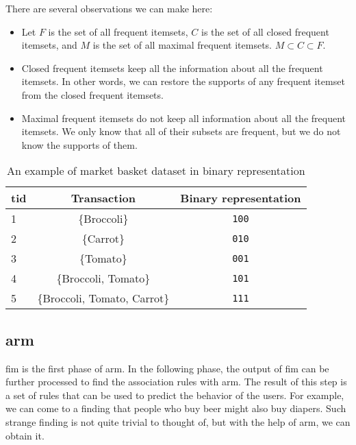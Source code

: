 There are several observations we can make here:
\begin{itemize}
    \item Let $F$ is the set of all frequent itemsets, $C$ is the set of all closed frequent itemsets, and $M$ is the set of all maximal frequent itemsets. $M \subset C \subset F$.
    \item Closed frequent itemsets keep all the information about all the frequent itemsets. In other words, we can restore the supports of any frequent itemset from the closed frequent itemsets.
    \item Maximal frequent itemsets do not keep all information about all the frequent itemsets. We only know that all of their subsets are frequent, but we do not know the supports of them.
\end{itemize}


\begin{table}[tb]
    \centering
    \begin{tabular}{|l|c|c|}
        \hline
        \textbf{\ac{tid}} & \textbf{Transaction}         & \textbf{Binary representation} \\ \hline
        1            & \{Broccoli\}                 & \texttt{100}                   \\ \hline
        2            & \{Carrot\}                   & \texttt{010}                   \\ \hline
        3            & \{Tomato\}                   & \texttt{001}                   \\ \hline
        4            & \{Broccoli, Tomato\}         & \texttt{101}                   \\ \hline
        5            & \{Broccoli, Tomato, Carrot\} & \texttt{111}                   \\ \hline
    \end{tabular}
    \caption{An example of market basket dataset in binary representation}
    \label{tab:market-basket-dataset}
\end{table}
\subsection{\Acl{arm}}
\label{sub:association_rule_mining}
\Ac{fim} is the first phase of \ac{arm}.
In the following phase, the output of \ac{fim} can be further processed to find the association rules with \acl{arm}.
The result of this step is a set of rules that can be used to predict the behavior of the users.
For example, we can come to a finding that people who buy beer might also buy diapers.
Such strange finding is not quite trivial to thought of, but with the help of \acl{arm}, we can obtain it.

